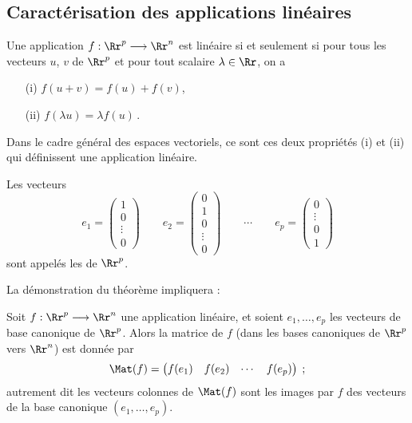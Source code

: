 \documentclass[class=report,crop=false]{standalone}
\begin{document}
\subsection{Caractérisation des applications linéaires}


\begin{theoreme}
\label{th:applinrn}
Une application $f: \Rr^p \longrightarrow \Rr^n$ est linéaire si et seulement si
pour tous les vecteurs $u$, $v$ de $\Rr^p$ et pour tout scalaire $\lambda \in \Rr$,
on a
\begin{enumerate}
  \item[(i)]  $f(u+v) = f(u) + f(v)$,
  \item[(ii)] $ f(\lambda u) = \lambda f(u)\, .$
\end{enumerate}
\end{theoreme}

Dans le cadre général des espaces vectoriels, ce sont ces deux propriétés (i) et (ii) qui définissent une
application linéaire.

\begin{definition}
Les vecteurs
$$
e_1 = \begin{pmatrix} 1\\0\\\vdots\\0\end{pmatrix}\qquad
e_2 = \begin{pmatrix} 0\\1\\0\\\vdots\\0\end{pmatrix}\qquad\cdots\qquad
e_p = \begin{pmatrix} 0\\\vdots\\0\\1\end{pmatrix}
$$
sont appelés les  de $\Rr^p$.
\end{definition}

La démonstration du théorème impliquera :
\begin{corollaire}
Soit $f: \Rr^p \longrightarrow \Rr^n$ une application linéaire, et soient $e_1, \ldots , e_p$
les vecteurs de base canonique de $\Rr^p$. Alors la matrice de $f$ (dans les bases canoniques
de $\Rr^p$ vers $\Rr^n$) est donnée par
$$\Mat(f) = \begin{pmatrix} f(e_1)&f(e_2)& \cdots& f(e_p)\end{pmatrix}\; ;$$
autrement dit les vecteurs colonnes de $\Mat(f)$
sont les images par $f$ des vecteurs de la base canonique $(e_1, \ldots , e_p)$.
\end{corollaire}
\end{document}
